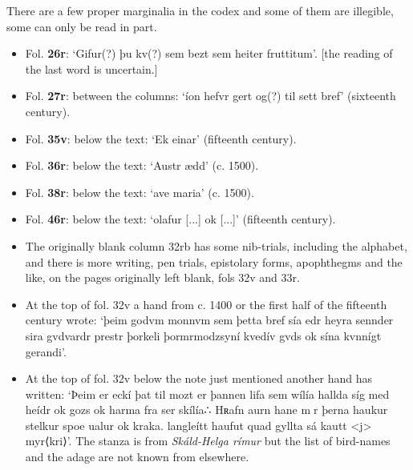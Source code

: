 \documentclass[11pt,twoside]{article}\makeatletter
\def\gap{}
\begin{document}
There are a few proper marginalia in the codex and some of them are illegible, some can only be read in part. \begin{itemize}

\item Fol. \textbf{26r}:  ‘Gifur(?) þu kv(?) {\hskip1pt}\newline  sem bezt sem {\hskip1pt}\newline  heiter frut{\hskip1pt}\newline titum’. [the reading of the last word is uncertain.] 
\item Fol. \textbf{27r}:  between the columns: ‘íon {\hskip1pt}\newline  hef{\hskip1pt}\newline vr g{\hskip1pt}\newline ert og(?) {\hskip1pt}\newline  til {\hskip1pt}\newline  sett {\hskip1pt}\newline  [...]{\gap }br{\hskip1pt}\newline ef’ (sixteenth century).
\item Fol. \textbf{35v}:  below the text: ‘Ek einar’ (fifteenth century).
\item Fol. \textbf{36r}:  below the text: ‘Austr ædd’ (c. 1500).
\item Fol. \textbf{38r}:  below the text: ‘ave maria’ (c. 1500).
\item Fol. \textbf{46r}:  below the text: ‘olafur [...]{\gap } {\hskip1pt}\newline  ok [...]{\gap }’ (fifteenth century).
\item The originally blank column 32rb has some nib-trials, including the alphabet, and there is more writing, pen trials, epistolary forms, apophthegms and the like, on the pages originally left blank, fols 32v and 33r.
\item At the top of fol. 32v a hand from c. 1400 or the first half of the fifteenth century wrote: ‘þeim godvm monnvm sem þetta bref sía edr heyra sennder sira gvdvardr prestr {\hskip1pt}\newline  þorkeli þormrmodzsyní kvedív gvds ok sína kvnnígt gerandi’.
\item At the top of fol. 32v below the note just mentioned another hand has written: ‘Þeim er eckí þat til mozt er þannen lifa sem wílía hallda síg med heídr ok gozs ok harma fra ser skílía∴ {\hskip1pt}\newline  Hʀafn aurn hane mr þerna haukur stelkur spoe ualur ok kraka. langleítt haufut quad gyllta sá kautt <j> myr⟨kri⟩’. The stanza is from \textit{Skáld-Helga rímur} but the list of bird-names and the adage are not known from elsewhere.

\end{itemize}
\end{document}
